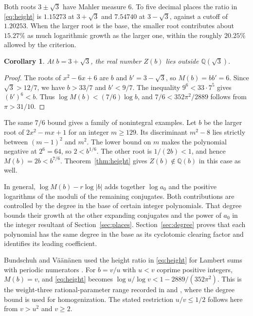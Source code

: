 \documentclass[11pt,letterpaper]{article}
\newtheorem{corollary}[theorem]{Corollary}
\numberwithin{equation}{section}
\newcommand{\Q}{\mathbb Q}
\begin{document}
Both roots \(3\pm\sqrt3\) have Mahler measure \(6\). To five decimal
places the ratio in \eqref{eq:height} is \(1.15273\) at \(3+\sqrt3\)
and \(7.54740\) at \(3-\sqrt3\), against a cutoff of \(1.20253\).
When the larger root is the base, the smaller root contributes
about \(15.27\%\) as much logarithmic growth as the larger one,
within the roughly \(20.25\%\) allowed by the criterion.

\begin{corollary}\label{cor:sqrt}
At \(b=3+\sqrt3\), the real number \(Z(b)\) lies outside \(\Q(\sqrt3)\).
\end{corollary}
\begin{proof}
The roots of \(x^2-6x+6\) are \(b\) and \(b'=3-\sqrt3\), so
\(M(b)=bb'=6\). Since \(\sqrt3>12/7\), we have \(b>33/7\) and
\(b'<9/7\). The inequality \(9^6<33\cdot7^5\) gives \((b')^6<b\).
Thus \(\log M(b)<(7/6)\log b\), and
\(7/6<352\pi^2/2889\) follows from \(\pi>31/10\).
\end{proof}

The same \(7/6\) bound gives a family of nonintegral examples. Let
\(b\) be the larger root of \(2x^2-mx+1\) for an integer \(m\ge129\).
Its discriminant \(m^2-8\) lies strictly between \((m-1)^2\) and
\(m^2\). The lower bound on \(m\) makes the polynomial negative at
\(2^6=64\), so \(2<b^{1/6}\). The other root is \(1/(2b)<1\),
and hence \(M(b)=2b<b^{7/6}\).
Theorem~\ref{thm:height} gives \(Z(b)\notin\Q(b)\) in this case as well.

In general, \(\log M(b)-r\log|b|\) adds together \(\log a_0\) and
the positive logarithms of the moduli of the remaining conjugates.
Both contributions are controlled by the degree in the base of certain
integer polynomials. That degree bounds their growth at the other
expanding conjugates and the power of \(a_0\) in the integer resultant
of Section~\ref{sec:places}. Section~\ref{sec:degree} proves that
each polynomial has the same degree in the base as its cyclotomic
clearing factor and identifies its leading coefficient.

Bundschuh and V\"a\"an\"anen used the height ratio in \eqref{eq:height}
for Lambert sums with periodic numerators \cite[\S2, (2)]{BV}.
For \(b=v/u\) with \(u<v\) coprime positive integers, \(M(b)=v\),
and \eqref{eq:height} becomes \(\log u/\log v<1-2889/(352\pi^2)\).
This is the weight-three rational-parameter range recorded in
\cite[\S7.1]{Uplift} and \cite[entry FUT-RATIONAL]{Companion},
where the degree bound is used for homogenization. The stated
restriction \(u/v\le1/2\) follows here from \(v>u^2\) and \(v\ge2\).
\end{document}
